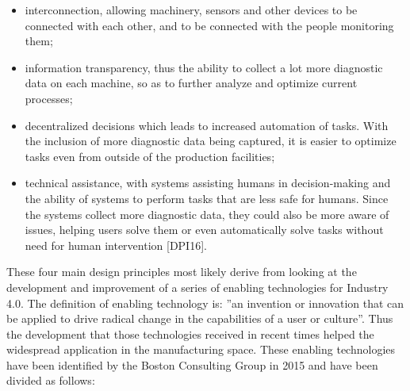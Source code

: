 \documentclass[a4paper, 12pt]{book}
\begin{document}
\begin{itemize}
    \item interconnection, allowing machinery, sensors and other devices to be connected with each other, and to be connected with the people monitoring them;
    \item information transparency, thus the ability to collect a lot more diagnostic data on each machine, so as to further analyze and optimize current processes;
    \item decentralized decisions which leads to increased automation of tasks. With the inclusion of more diagnostic data being captured, it is easier to optimize tasks even from outside of the production facilities;
    \item technical assistance, with systems assisting humans in decision-making and the ability of systems to perform tasks that are less safe for humans. Since the systems collect more diagnostic data, they could also be more aware of issues, helping users solve them or even automatically solve tasks without need for human intervention [DPI16].
\end{itemize}

These four main design principles most likely derive from looking at the development and improvement of a series of enabling technologies for Industry 4.0. The definition of enabling technology is: ”an invention or innovation that can be applied to drive radical change in the capabilities of a user or culture”. Thus the development that those technologies received in recent times helped the widespread application in the manufacturing space. These enabling technologies have been identified by the Boston Consulting Group in 2015 and have been divided as follows:
\end{document}
